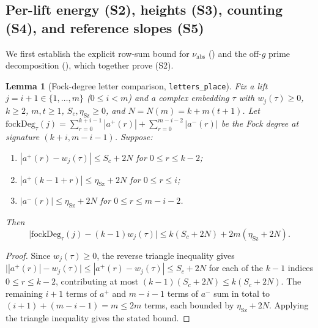 \documentclass[11pt]{amsart}
\theoremstyle{plain}
\newtheorem{lemma}[theorem]{Lemma}
\theoremstyle{definition}
\numberwithin{equation}{section}
\begin{document}
\subsection{Per-lift energy (S2), heights (S3), counting (S4), and reference slopes (S5)}

We first establish the explicit row-sum bound for $\nu_{\mathrm{abs}}$ ()
and the off-$g$ prime decomposition (), which together prove
\textup{(S2)}.

\begin{lemma}[Fock-degree letter comparison, \texttt{letters\_place}]\label{lem:lettersplace}
Fix a lift $j=i+1\in\{1,\dots,m\}$ ($0\le i<m$) and a complex embedding $\tau$ with
$w_j(\tau)\ge0$, $k\ge2$, $m,t\ge1$, $S_c,\eta_{\mathrm{Sz}}\ge0$, and $N=N(m)=k+m(t+1)$. Let
$\mathrm{fockDeg}_\tau(j)=\sum_{r=0}^{k+i-1}|a^+(r)|+\sum_{r=0}^{m-i-2}|a^-(r)|$ be the Fock
degree at signature $(k+i,m-i-1)$. Suppose:
\begin{enumerate}[label=(\alph*)]
\item $|a^+(r)-w_j(\tau)|\le S_c+2N$ for $0\le r\le k-2$;
\item $|a^+(k-1+r)|\le\eta_{\mathrm{Sz}}+2N$ for $0\le r\le i$;
\item $|a^-(r)|\le\eta_{\mathrm{Sz}}+2N$ for $0\le r\le m-i-2$.
\end{enumerate}
Then
\[
\bigl|\mathrm{fockDeg}_\tau(j)-(k-1)w_j(\tau)\bigr|\le k(S_c+2N)+2m(\eta_{\mathrm{Sz}}+2N).
\]
\end{lemma}

\begin{proof}
Since $w_j(\tau)\ge0$, the reverse triangle inequality gives
$\bigl||a^+(r)|-w_j(\tau)\bigr|\le|a^+(r)-w_j(\tau)|\le S_c+2N$ for each of the $k-1$ indices
$0\le r\le k-2$, contributing at most $(k-1)(S_c+2N)\le k(S_c+2N)$. The remaining $i+1$ terms of
$a^+$ and $m-i-1$ terms of $a^-$ sum in total to $(i+1)+(m-i-1)=m\le 2m$ terms, each bounded by
$\eta_{\mathrm{Sz}}+2N$. Applying the triangle inequality gives the stated bound.
\end{proof}
\end{document}
